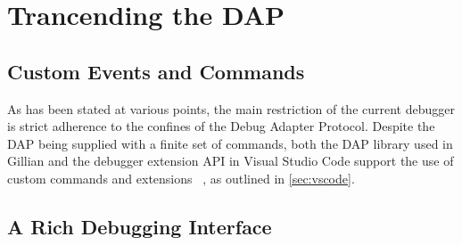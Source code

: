 
\section{Trancending the DAP}\label{sec:debug-interface}

\subsection{Custom Events and Commands}

As has been stated at various points, the main restriction of the current
debugger is strict adherence to the confines of the Debug Adapter Protocol.
Despite the DAP being supplied with a finite set of commands, both the DAP
library used in Gillian and the debugger extension API in Visual Studio Code
support the use of custom commands and extensions%
~\cite{ocaml-dap-custom, vscode-dap-custom-event, vscode-dap-custom-request}, as
outlined in \autoref{sec:vscode}.



\subsection{A Rich Debugging Interface}
